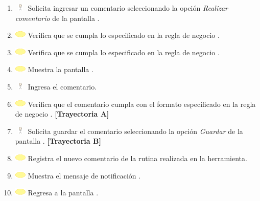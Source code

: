 \begin{enumerate}
	\item \includegraphics[width=15pt, height=10pt]{./Figuras/iconosCU/usuario.png} Solicita ingresar un comentario seleccionando la opción \textit{Realizar comentario} de la pantalla .
	\item \includegraphics[width=15pt]{./Figuras/iconosCU/herramienta.png} Verifica que se cumpla lo especificado en la regla de negocio .
	\item \includegraphics[width=15pt]{./Figuras/iconosCU/herramienta.png} Verifica que se cumpla lo especificado en la regla de negocio .
	\item \includegraphics[width=15pt]{./Figuras/iconosCU/herramienta.png} Muestra la pantalla .
	\item \includegraphics[width=15pt, height=10pt]{./Figuras/iconosCU/usuario.png} Ingresa el comentario.
	\item \includegraphics[width=15pt]{./Figuras/iconosCU/herramienta.png} Verifica que el comentario cumpla con el formato especificado en la regla de negocio . \textbf{[Trayectoria A]}
	\item \includegraphics[width=15pt, height=10pt]{./Figuras/iconosCU/usuario.png} Solicita guardar el comentario seleccionando la opción \textit{Guardar} de la pantalla . \textbf{[Trayectoria B]}
	\item \includegraphics[width=15pt]{./Figuras/iconosCU/herramienta.png} Registra el nuevo comentario de la rutina realizada en la herramienta. 
	\item \includegraphics[width=15pt]{./Figuras/iconosCU/herramienta.png} Muestra el mensaje de notificación .
	\item \includegraphics[width=15pt]{./Figuras/iconosCU/herramienta.png} Regresa a la pantalla .
\end{enumerate}
	
